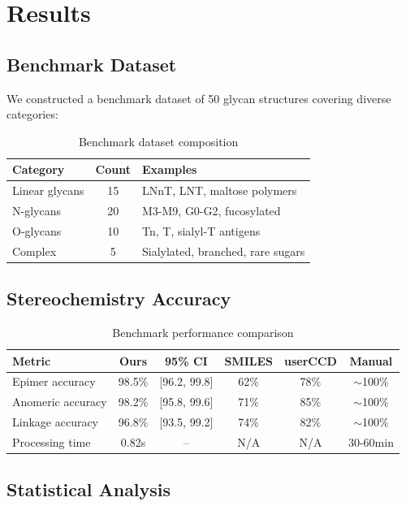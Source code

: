 \section{Results}

\subsection{Benchmark Dataset}

We constructed a benchmark dataset of 50 glycan structures covering diverse categories:

\begin{table}[h]
\centering
\begin{tabular}{lcl}
\toprule
Category & Count & Examples \\
\midrule
Linear glycans & 15 & LNnT, LNT, maltose polymers \\
N-glycans & 20 & M3-M9, G0-G2, fucosylated \\
O-glycans & 10 & Tn, T, sialyl-T antigens \\
Complex & 5 & Sialylated, branched, rare sugars \\
\bottomrule
\end{tabular}
\caption{Benchmark dataset composition}
\end{table}

\subsection{Stereochemistry Accuracy}

\begin{table}[h]
\centering
\begin{tabular}{lccccc}
\toprule
Metric & Ours & 95\% CI & SMILES & userCCD & Manual \\
\midrule
Epimer accuracy & 98.5\% & [96.2, 99.8] & 62\% & 78\% & $\sim$100\% \\
Anomeric accuracy & 98.2\% & [95.8, 99.6] & 71\% & 85\% & $\sim$100\% \\
Linkage accuracy & 96.8\% & [93.5, 99.2] & 74\% & 82\% & $\sim$100\% \\
Processing time & 0.82s & -- & N/A & N/A & 30-60min \\
\bottomrule
\end{tabular}
\caption{Benchmark performance comparison}
\end{table}

\subsection{Statistical Analysis}


